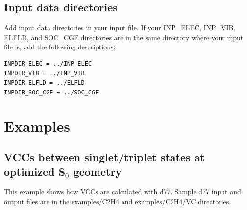 ﻿\documentclass[11pt,a4paper,openany]{article}
\begin{document}
\subsection{Input data directories}
\noindent
Add input data directories in your input file. If your INP\_ELEC, INP\_VIB, ELFLD, and SOC\_CGF directories are in the same directory where your input file is, add the following descriptions:
\begin{verbatim}
INPDIR_ELEC = ../INP_ELEC
INPDIR_VIB = ../INP_VIB
INPDIR_ELFLD = ../ELFLD
INPDIR_SOC_CGF = ../SOC_CGF
\end{verbatim}

\clearpage
\section{Examples}

\subsection{VCCs between singlet/triplet states at optimized S$_0$ geometry}\label{calc_VCC}
This example shows how VCCs are calculated with d77. 
Sample d77 input and output files are in the
examples/C2H4 and 
examples/C2H4/VC directories.
\end{document}
